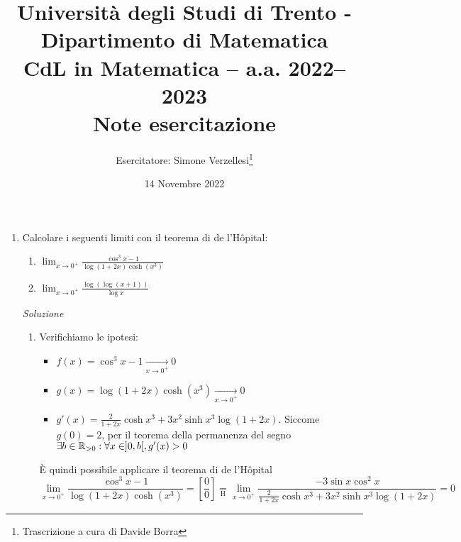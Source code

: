\documentclass{article}
\title{Università degli Studi di Trento - Dipartimento di Matematica\\
CdL in Matematica – a.a. 2022–2023\\ Note esercitazione}
\author{Esercitatore: Simone Verzellesi\thanks{Trascrizione a cura di Davide Borra}}
\date{14 Novembre 2022}
\begin{document}
\maketitle
{}
\setlength{\headheight}{30pt}
\begin{enumerate}[label=\textbf{Esercizio 
    8.\arabic*.},itemindent=*]
    \item Calcolare i seguenti limiti con il teorema di de l'Hôpital:
    \begin{enumerate}
        \item $\lim_{x\to 0^+}\frac{\cos^3x-1}{\log(1+2x)\cosh(x^3)}$
        \item $\lim_{x\to 0^+}\frac{\log(\log(x+1))}{\log x}$
    \end{enumerate}
    \item[\textit{\large Soluzione~}]~
    \begin{enumerate}
        \item Verifichiamo le ipotesi:
        \begin{itemize}
            \item $f(x)=\cos^3x-1\underset{x\to0^+}{\longrightarrow}0$
            \item $g(x)=\log(1+2x)\cosh(x^3)\underset{x\to0^+}{\longrightarrow}0$
            \item $g'(x)=\frac{2}{1+2x}\cosh x^3+3x^2\sinh x^3\log(1+2x)$. Siccome $g(0)=2$, per il teorema della permanenza del segno $\exists b\in \mathbb{R}_{>0}:\forall x \in ]0,b[, g'(x)>0$
        \end{itemize}
        È quindi possibile applicare il teorema di de l'Hôpital
        \[\lim_{x\to 0^+}\frac{\cos^3x-1}{\log(1+2x)\cosh(x^3)}=\left[ \frac{0}{0} \right]\underset{\text{H}}=\lim_{x\to0^+}\frac{-3\sin x \cos^2 x}{\frac{2}{1+2x}\cosh x^3+3x^2\sinh x^3\log(1+2x)}=0\]


\end{enumerate}
\end{enumerate}
\end{document}
